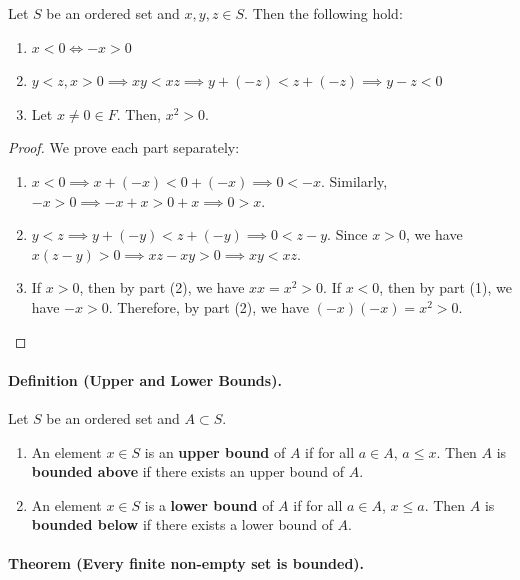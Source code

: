 \documentclass[openany]{book}
\numberwithin{equation}{section}
\begin{document}
    Let $S$ be an ordered set and $x, y, z \in S$. Then the following hold:
    \begin{enumerate}
        \item $x < 0 \iff -x > 0$
        \item $y < z, x > 0 \implies xy < xz \implies y + (-z) < z + (-z) \implies y - z < 0$
        \item Let $x \neq 0 \in F$. Then, $x^2 > 0$.
    \end{enumerate}
\par
\begin{proof}
    We prove each part separately:
    \begin{enumerate}
        \item $x < 0 \implies x + (-x) < 0 + (-x) \implies 0 < -x$. Similarly, $-x > 0 \implies -x + x > 0 + x \implies 0 > x$.
        \item $y < z \implies y + (-y) < z + (-y) \implies 0 < z - y$. Since $x > 0$, we have $x(z - y) > 0 \implies xz - xy > 0 \implies xy < xz$.
        \item If $x > 0$, then by part (2), we have $xx = x^2 > 0$. If $x < 0$, then by part (1), we have $-x > 0$. Therefore, by part (2), we have $(-x)(-x) = x^2 > 0$.
    \end{enumerate}
\end{proof}
\paragraph{Definition (Upper and Lower Bounds).}

    Let $S$ be an ordered set and $A \subset S$.
    \begin{enumerate}
        \item An element $x \in S$ is an \textbf{upper bound} of $A$ if for all $a \in A$, $a \leq x$. Then $A$ is \textbf{bounded above} if there exists an upper bound of $A$.
        \item An element $x \in S$ is a \textbf{lower bound} of $A$ if for all $a \in A$, $x \leq a$. Then $A$ is \textbf{bounded below} if there exists a lower bound of $A$.
    \end{enumerate}
\par
\paragraph{Theorem (Every finite non-empty set is bounded).}
\end{document}
